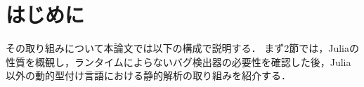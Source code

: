 \section{はじめに}

その取り組みについて本論文では以下の構成で説明する．
まず2節では，Juliaの性質を概観し，ランタイムによらないバグ検出器の必要性を確認した後，Julia以外の動的型付け言語における静的解析の取り組みを紹介する．
